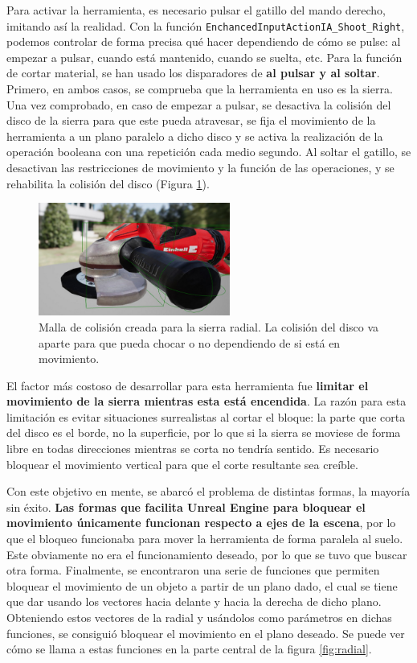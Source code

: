 Para activar la herramienta, es necesario pulsar el gatillo del mando derecho, imitando así la realidad. Con la función \texttt{EnchancedInputActionIA\_Shoot\_Right}, podemos controlar de forma precisa qué hacer dependiendo de cómo se pulse: al empezar a pulsar, cuando está mantenido, cuando se suelta, etc. Para la función de cortar material, se han usado los disparadores de \textbf{al pulsar y al soltar}. Primero, en ambos casos, se comprueba que la herramienta en uso es la sierra. Una vez comprobado, en caso de empezar a pulsar, se desactiva la colisión del disco de la sierra para que este pueda atravesar, se fija el movimiento de la herramienta a un plano paralelo a dicho disco y se activa la realización de la operación booleana con una repetición cada medio segundo. Al soltar el gatillo, se desactivan las restricciones de movimiento y la función de las operaciones, y se rehabilita la colisión del disco (Figura \ref{fig:grinder_collision}).

\begin{figure}[H]
	\centering
	\includegraphics[width=6.3cm]{imagenes/grinder_collision}
	\caption{Malla de colisión creada para la sierra radial. La colisión del disco va aparte para que pueda chocar o no dependiendo de si está en movimiento.}
	\label{fig:grinder_collision}
\end{figure}

El factor más costoso de desarrollar para esta herramienta fue \textbf{limitar el movimiento de la sierra mientras esta está encendida}. La razón para esta limitación es evitar situaciones surrealistas al cortar el bloque: la parte que corta del disco es el borde, no la superficie, por lo que si la sierra se moviese de forma libre en todas direcciones mientras se corta no tendría sentido. Es necesario bloquear el movimiento vertical para que el corte resultante sea creíble.

Con este objetivo en mente, se abarcó el problema de distintas formas, la mayoría sin éxito. \textbf{Las formas que facilita Unreal Engine para bloquear el movimiento únicamente funcionan respecto a ejes de la escena}, por lo que el bloqueo funcionaba para mover la herramienta de forma paralela al suelo. Este obviamente no era el funcionamiento deseado, por lo que se tuvo que buscar otra forma. Finalmente, se encontraron una serie de funciones que permiten bloquear el movimiento de un objeto a partir de un plano dado, el cual se tiene que dar usando los vectores hacia delante y hacia la derecha de dicho plano. Obteniendo estos vectores de la radial y usándolos como parámetros en dichas funciones, se consiguió bloquear el movimiento en el plano deseado. Se puede ver cómo se llama a estas funciones en la parte central de la figura \ref{fig:radial}.

